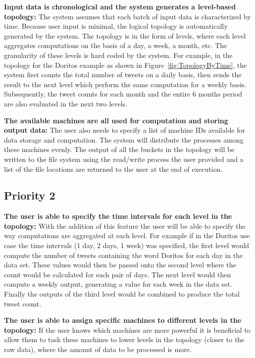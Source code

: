 \documentclass[a4paper]{article}
\begin{document}
{\bf Input data is chronological and the system generates a level-based topology:} The system assumes that each batch of input data is characterized by time. Because user input is minimal, the logical topology is automatically generated by the system. The topology is in the form of levels, where each level aggregates computations on the basis of a day, a week, a month, etc. The granularity of these levels is hard coded by the system. For example, in the topology for the Doritos example as shown in Figure~\ref{fig:TopologyByTime}, the system first counts the total number of tweets on a daily basis, then sends the result to the next level which perform the same computation for a weekly basis. Subsequently, the tweet counts for each month and the entire 6 months period are also evaluated in the next two levels.

{\bf The available machines are all used for computation and storing output data:} The user also needs to specify a list of machine IDs available for data storage and computation. The system will distribute the processes among these machines evenly. The output of all the buckets in the topology will be written to the file system using the read/write process the user provided and a list of the file locations are returned to the user at the end of execution.

\subsection{Priority 2}
{\bf The user is able to specify the time intervals for each level in the topology:} With the addition of this feature the user will be able to specify the way computations are aggregated at each level.  For example if in the Doritos use case the time intervals (1 day, 2 days, 1 week) was specified, the first level would compute the number of tweets containing the word Doritos for each day in the data set.  These values would then be passed onto the second level where the count would be calculated for each pair of days. The next level would then compute a weekly output, generating a value for each week in the data set.  Finally the outputs of the third level would be combined to produce the total tweet count.  

{\bf The user is able to assign specific machines to different levels in the topology:} If the user knows which machines are more powerful it is beneficial to allow them to task these machines to lower levels in the topology (closer to the raw data), where the amount of data to be processed is more.  
\end{document}

